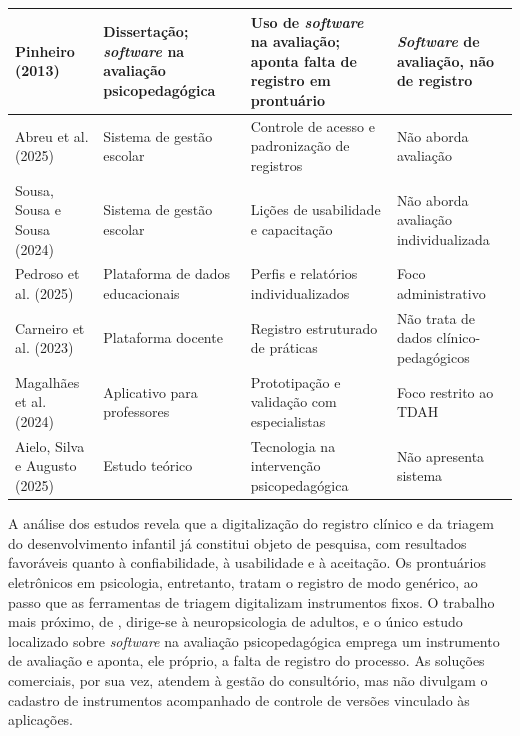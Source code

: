 {\begin{longtable}{|>{\raggedright\arraybackslash}p{2.6cm}|>{\raggedright\arraybackslash}p{2.8cm}|>{\raggedright\arraybackslash}p{4.2cm}|>{\raggedright\arraybackslash}p{4.2cm}|}
Pinheiro (2013) & Dissertação; \textit{software} na avaliação psicopedagógica & Uso de \textit{software} na avaliação; aponta falta de registro em prontuário & \textit{Software} de avaliação, não de registro \\ \hline
Abreu et al. (2025) & Sistema de gestão escolar & Controle de acesso e padronização de registros & Não aborda avaliação \\ \hline
Sousa, Sousa e Sousa (2024) & Sistema de gestão escolar & Lições de usabilidade e capacitação & Não aborda avaliação individualizada \\ \hline
Pedroso et al. (2025) & Plataforma de dados educacionais & Perfis e relatórios individualizados & Foco administrativo \\ \hline
Carneiro et al. (2023) & Plataforma docente & Registro estruturado de práticas & Não trata de dados clínico-pedagógicos \\ \hline
Magalhães et al. (2024) & Aplicativo para professores & Prototipação e validação com especialistas & Foco restrito ao TDAH \\ \hline
Aielo, Silva e Augusto (2025) & Estudo teórico & Tecnologia na intervenção psicopedagógica & Não apresenta sistema \\ \hline
\end{longtable}
\vspace{-0.5\baselineskip}
}

A análise dos estudos revela que a digitalização do registro clínico e da triagem do desenvolvimento infantil já constitui objeto de pesquisa, com resultados favoráveis quanto à confiabilidade, à usabilidade e à aceitação. Os prontuários eletrônicos em psicologia, entretanto, tratam o registro de modo genérico, ao passo que as ferramentas de triagem digitalizam instrumentos fixos. O trabalho mais próximo, de , dirige-se à neuropsicologia de adultos, e o único estudo localizado sobre \textit{software} na avaliação psicopedagógica \cite{pinheiro2013_avaliacao_psicopedagogica} emprega um instrumento de avaliação e aponta, ele próprio, a falta de registro do processo. As soluções comerciais, por sua vez, atendem à gestão do consultório, mas não divulgam o cadastro de instrumentos acompanhado de controle de versões vinculado às aplicações.

